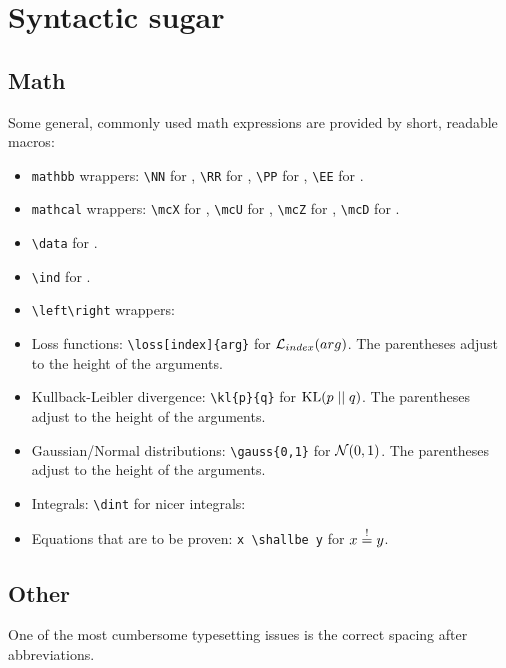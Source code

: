 \documentclass
[
twoside, %
]
{article}
\begin{document}
\section{Syntactic sugar}
\subsection{Math}
Some general, commonly used math expressions are provided by short, readable macros:
\begin{itemize}
	\item \texttt{mathbb} wrappers: \texttt{\textbackslash NN} for \NN, \texttt{\textbackslash RR} for \RR, \texttt{\textbackslash PP} for \PP, \texttt{\textbackslash EE} for \EE.
	\item \texttt{mathcal} wrappers: \texttt{\textbackslash mcX} for \mcX, \texttt{\textbackslash mcU} for \mcU, \texttt{\textbackslash mcZ} for \mcZ, \texttt{\textbackslash mcD} for \mcD.
	\item \texttt{\textbackslash data} for \data.
	\item \texttt{\textbackslash ind} for \ind.	
	\item \texttt{\textbackslash left\textbackslash right} wrappers: 
	\item Loss functions: \texttt{\textbackslash loss[index]\{arg\}} for $\loss[index]{arg}$. The parentheses adjust to the height of the arguments.
	\item Kullback-Leibler divergence: \texttt{\textbackslash kl\{p\}\{q\}} for $\kl{p}{q}$. The parentheses adjust to the height of the arguments.
	\item Gaussian/Normal distributions: \texttt{\textbackslash gauss\{0,1\}} for $\gauss{0, 1}$. The parentheses adjust to the height of the arguments.
	\item Integrals: \texttt{\textbackslash dint} for nicer integrals: 
	\item Equations that are to be proven: \texttt{x \textbackslash shallbe y} for $x \;{\overset{!}=}\; y$. 
\end{itemize}
\subsection{Other}
One of the most cumbersome typesetting issues is the correct spacing after abbreviations.
\end{document}
